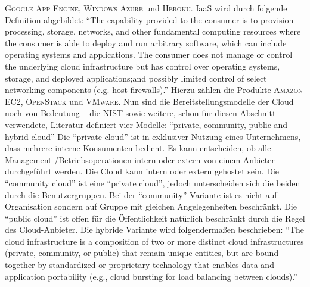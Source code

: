 \textsc{Google App Engine}, \textsc{Windows Azure} und \textsc{Heroku}.\autocite[vgl.][S.8]{kumar_reliability_2018} \ac{IaaS} wird durch folgende Definition abgebildet: \enquote{The capability provided to the consumer is to provision processing, storage, networks, and other fundamental computing resources where the consumer is able to deploy and run arbitrary software, which can include operating systems and applications. The consumer does not manage or control the underlying cloud infrastructure but has control over operating systems, storage, and deployed applications;and possibly limited control of select networking components (e.g. host firewalls).}\autocite[][S.3]{mell_nist_2011} Hierzu zählen die Produkte \textsc{Amazon EC2}, \textsc{OpenStack} und \textsc{VMware}. Nun sind die Bereitstellungsmodelle der Cloud noch von Bedeutung -- die \ac{NIST} sowie weitere, schon für diesen Abschnitt verwendete, Literatur definiert vier Modelle: \enquote{private, community, public and hybrid cloud} Die \enquote{private cloud} ist in exklusiver Nutzung eines Unternehmens, dass mehrere interne Konsumenten bedient. Es kann entscheiden, ob alle Management-/Betriebsoperationen intern oder extern von einem Anbieter durchgeführt werden. Die Cloud kann intern oder extern gehostet sein. Die \enquote{community cloud} ist eine \enquote{private cloud}, jedoch unterscheiden sich die beiden durch die Benutzergruppen. Bei der \enquote{community}-Variante ist es nicht auf Organisation sondern auf Gruppe mit gleichen Angelegenheiten beschränkt. Die \enquote{public cloud} ist offen für die Öffentlichkeit natürlich beschränkt durch die Regel des Cloud-Anbieter. Die hybride Variante wird folgendermaßen beschrieben: \enquote{The cloud infrastructure is a composition of two or more distinct cloud infrastructures (private, community, or public) that remain unique entities, but are bound together by standardized or proprietary technology that enables data and application portability (e.g., cloud bursting for load balancing between clouds).}\autocite[][S.3]{mell_nist_2011}
